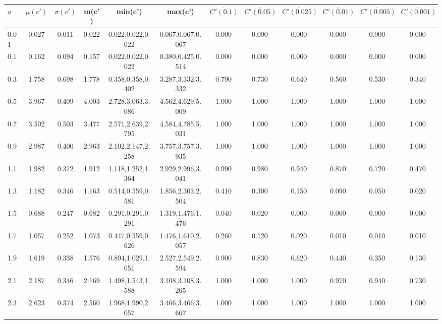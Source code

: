 \begin{table*}[h!]
\begin{center}
\begin{tabular}{| l | c | c | c | c | c | c | c | c | c | c | c |}\hline
$a$ & $\mu(c')$ & $\sigma(c')$ & m(c') & min(c') & max(c') & $\overline{C'(0.1)}$ & $\overline{C'(0.05)}$ & $\overline{C'(0.025)}$ & $\overline{C'(0.01)}$ & $\overline{C'(0.005)}$ & $\overline{C'(0.001)}$ \\\hline
0.01 & 0.027 & 0.011 & 0.022 & 0.022,0.022,0.022 & 0.067,0.067,0.067  & 0.000  & 0.000  & 0.000  & 0.000  & 0.000  & 0.000 \\\hline
0.1 & 0.162 & 0.094 & 0.157 & 0.022,0.022,0.022 & 0.380,0.425,0.514  & 0.000  & 0.000  & 0.000  & 0.000  & 0.000  & 0.000 \\\hline
0.3 & 1.758 & 0.698 & 1.778 & 0.358,0.358,0.402 & 3.287,3.332,3.332  & 0.790  & 0.730  & 0.640  & 0.560  & 0.530  & 0.340 \\\hline
0.5 & 3.967 & 0.409 & 4.003 & 2.728,3.063,3.086 & 4.562,4.629,5.009  & 1.000  & 1.000  & 1.000  & 1.000  & 1.000  & 1.000 \\\hline
0.7 & 3.502 & 0.503 & 3.477 & 2.571,2.639,2.795 & 4.584,4.785,5.031  & 1.000  & 1.000  & 1.000  & 1.000  & 1.000  & 1.000 \\\hline
0.9 & 2.987 & 0.400 & 2.963 & 2.102,2.147,2.258 & 3.757,3.757,3.935  & 1.000  & 1.000  & 1.000  & 1.000  & 1.000  & 1.000 \\\hline
1.1 & 1.982 & 0.372 & 1.912 & 1.118,1.252,1.364 & 2.929,2.996,3.041  & 0.990  & 0.980  & 0.940  & 0.870  & 0.720  & 0.470 \\\hline
1.3 & 1.182 & 0.346 & 1.163 & 0.514,0.559,0.581 & 1.856,2.303,2.504  & 0.410  & 0.300  & 0.150  & 0.090  & 0.050  & 0.020 \\\hline
1.5 & 0.688 & 0.247 & 0.682 & 0.291,0.291,0.291 & 1.319,1.476,1.476  & 0.040  & 0.020  & 0.000  & 0.000  & 0.000  & 0.000 \\\hline
1.7 & 1.057 & 0.252 & 1.073 & 0.447,0.559,0.626 & 1.476,1.610,2.057  & 0.260  & 0.120  & 0.020  & 0.010  & 0.010  & 0.010 \\\hline
1.9 & 1.619 & 0.338 & 1.576 & 0.894,1.029,1.051 & 2.527,2.549,2.594  & 0.900  & 0.830  & 0.620  & 0.440  & 0.350  & 0.130 \\\hline
2.1 & 2.187 & 0.346 & 2.169 & 1.498,1.543,1.588 & 3.108,3.108,3.265  & 1.000  & 1.000  & 1.000  & 0.970  & 0.940  & 0.730 \\\hline
2.3 & 2.623 & 0.374 & 2.560 & 1.968,1.990,2.057 & 3.466,3.466,3.667  & 1.000  & 1.000  & 1.000  & 1.000  & 1.000  & 1.000 \\\hline

\end{tabular}
\end{center}
\end{table*}
